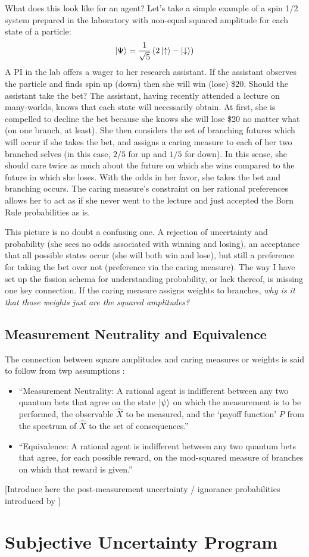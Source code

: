 \documentclass{article}
\begin{document}
What does this look like for an agent? Let’s take a simple example of a spin 1/2 system prepared in the laboratory with non-equal squared amplitude for each state of a particle:
\begin{gather}
  \ket{\Psi} = \frac{1}{\sqrt{5}}\left(2\ket{\uparrow} - \ket{\downarrow}\right)
\end{gather}
A PI in the lab offers a wager to her research assistant. If the assistant observes the particle and finds spin up (down) then she will win (lose) \$20. Should the assistant take the bet? The assistant, having recently attended a lecture on many-worlds, knows that each state will necessarily obtain. At first, she is compelled to decline the bet because she knows she will lose \$20 no matter what (on one branch, at least). She then considers the set of branching futures which will occur if she takes the bet, and assigns a caring measure to each of her two branched selves (in this case, $2/5$ for up and $1/5$ for down). In this sense, she should care twice as much about the future on which she wins compared to the future in which she loses. With the odds in her favor, she takes the bet and branching occurs. The caring measure’s constraint on her rational preferences allows her to act as if she never went to the lecture and just accepted the Born Rule probabilities as is. 

This picture is no doubt a confusing one. A rejection of uncertainty and probability (she sees no odds associated with winning and losing), an acceptance that all possible states occur (she will both win and lose), but still a preference for taking the bet over not (preference via the caring measure). The way I have set up the fission schema for understanding probability, or lack thereof, is missing one key connection. If the caring measure assigns weights to branches, \emph{why is it that those weights just are the squared amplitudes?}

\subsection{Measurement Neutrality and Equivalence}

The connection between square amplitudes and caring measures or weights is said to follow from twp assumptions \parencite[10]{greavesProbabilityEverettInterpretation2007}:

\begin{itemize}
\item ``Measurement Neutrality:  A rational agent is indifferent between any two quantum bets that agree on the state $\ket{\psi}$  on which the measurement is to be performed, the observable $\hat{X}$ to be measured, and the  `payoff function' $P$ from the spectrum of $\hat{X}$ to the set of consequences.''
  \item ``Equivalence:  A rational agent is indifferent between any two quantum bets that agree, for each possible reward, on the mod-squared measure of branches on which that reward is given.''
\end{itemize}


[Introduce here the post-measurement uncertainty / ignorance probabilities introduced by \parencite{vaidmanSchizophrenicExperiencesNeutron1998}]

\section{Subjective Uncertainty Program}

\printbibliography[heading=bibnumbered]
\end{document}
